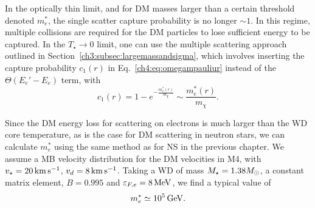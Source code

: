 In the optically thin limit, and for DM masses larger than a certain threshold denoted $m_e^*$, the single scatter capture probability is no longer $\sim 1$. In this regime, multiple collisions are required for the DM particles to lose sufficient energy to be captured. 
In the $T_\star\rightarrow0$ limit, one can use the multiple scattering approach outlined in Section~\ref{ch3:subsec:largemassandsigma}, which involves inserting the capture probability $c_1(r)$ in Eq.~\ref{ch4:eq:omegampauliur} instead of the $\Theta\left(E_e' - E_e\right)$ term, with
\begin{equation}
c_1(r) = 1-e^{-\frac{m^*_e(r)}{m_\chi}}\sim \frac{m^*_e(r)}{m_\chi}.
\end{equation}


Since the DM energy loss for scattering on electrons 
is much larger than the WD core temperature, as is the case for DM scattering in neutron stars, we can calculate $m_e^*$ using the same method as for NS in the previous chapter.  We assume a MB velocity distribution for the DM velocities in M4, with $v_\star=20{\rm \,km}{\rm \,s}^{-1}$, $v_d=8{\rm \,km}{\rm \,s}^{-1}$. Taking a WD of mass $M_\star=1.38M_\odot$, a constant matrix element, $B=0.995$ and $\varepsilon_{F,e}=8{\rm \,MeV}$, we find a typical value of 
\begin{equation}
m^*_e \simeq 10^5 {\rm \,GeV}. 
\end{equation}

